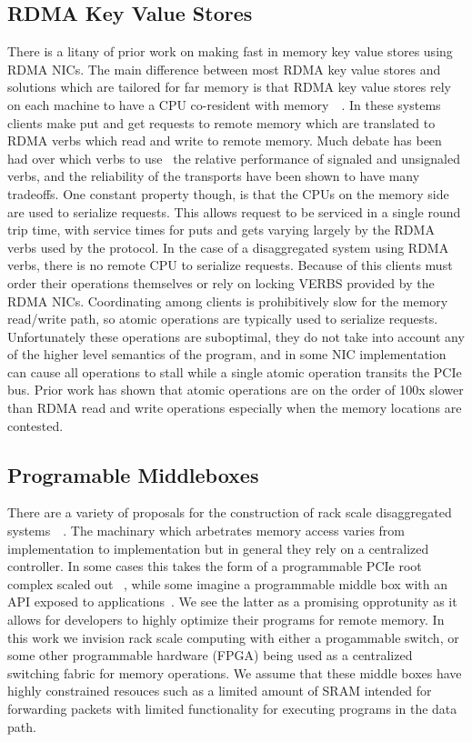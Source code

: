 \subsection{RDMA Key Value Stores}

There is a litany of prior work on making fast in memory key value stores using
RDMA NICs. The main difference between most RDMA key value stores and solutions
which are tailored for far memory is that RDMA key value stores rely on each
machine to have a CPU co-resident with memory~\cite{herd,pilaf,storm,soNUMA,
MemC3}~. In these systems clients make put and get requests to remote memory
which are translated to RDMA verbs which read and write to remote memory. Much
debate has been had over which verbs to use~\cite{storm, herd, eRPC} the
relative performance of signaled and unsignaled verbs, and the reliability of
the transports have been shown to have many tradeoffs. One constant property
though, is that the CPUs on the memory side are used to serialize requests. This
allows request to be serviced in a single round trip time, with service times
for puts and gets varying largely by the RDMA verbs used by the protocol. In the
case of a disaggregated system using RDMA verbs, there is no remote CPU to
serialize requests. Because of this clients must order their operations
themselves or rely on locking VERBS provided by the RDMA NICs. Coordinating
among clients is prohibitively slow for the memory read/write path, so atomic
operations are typically used to serialize requests. Unfortunately these
operations are suboptimal, they do not take into account any of the higher level
semantics of the program, and in some NIC implementation can cause all operations
to stall while a single atomic operation transits the PCIe bus. Prior work has
shown that atomic operations are on the order of 100x slower than RDMA read and
write operations especially when the memory locations are contested.

\subsection{Programable Middleboxes}

There are a variety of proposals for the construction of rack scale
disaggregated systems~\cite{firebox, beyond, disandapp}~. The machinary which arbetrates memory access varies from
implementation to implementation but in general they rely on a centralized
controller. In some cases this takes the form of a programmable PCIe root
complex scaled out ~, while some imagine a programmable
middle box with an API exposed to applications~\cite{disandapp}. We see the latter as a promising opprotunity as it allows for
developers to highly optimize their programs for remote memory. In this work we
invision rack scale computing with either a progammable switch, or some other
programmable hardware (FPGA) being used as a centralized switching fabric for
memory operations. We assume that these middle boxes have highly constrained
resouces such as a limited amount of SRAM intended for forwarding packets with
limited functionality for executing programs in the data path.


